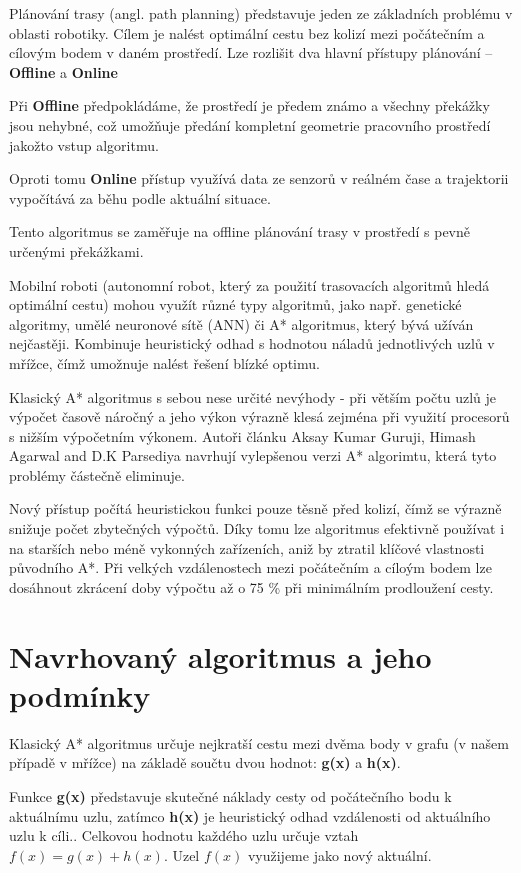 \documentclass[10pt, a4paper]{article}
\begin{document}
Plánování trasy (angl. path planning) představuje jeden ze základních problému v oblasti robotiky. Cílem je nalést optimální cestu bez kolizí mezi počátečním a cílovým bodem v daném prostředí. Lze rozlišit dva hlavní přístupy plánování – \textbf{Offline} a \textbf{Online}

Při \textbf{Offline} předpokládáme, že prostředí je předem známo a všechny překážky jsou nehybné, což umožňuje předání kompletní geometrie pracovního prostředí jakožto vstup algoritmu.

Oproti tomu \textbf{Online} přístup využívá data ze senzorů v reálném čase a trajektorii vypočítává za běhu podle aktuální situace.

Tento algoritmus se zaměřuje na offline plánování trasy v prostředí s pevně určenými překážkami.

Mobilní roboti (autonomní robot, který za použití trasovacích algoritmů hledá optimální cestu) mohou využít různé typy algoritmů, jako např. genetické algoritmy, umělé neuronové sítě (ANN) či A* algoritmus, který bývá užíván nejčastěji. Kombinuje heuristický odhad s hodnotou náladů jednotlivých uzlů v mřížce, čímž umožnuje nalést řešení blízké optimu.

Klasický A* algoritmus s sebou nese určité nevýhody - při větším počtu uzlů je výpočet časově náročný a jeho výkon výrazně klesá zejména při využití procesorů s nižším výpočetním výkonem. Autoři článku Aksay Kumar Guruji, Himash Agarwal and D.K Parsediya navrhují vylepšenou verzi A* algorimtu, která tyto problémy částečně eliminuje.

Nový přístup počítá heuristickou funkci pouze těsně před kolizí, čímž se výrazně snižuje počet zbytečných výpočtů. Díky tomu lze algoritmus efektivně používat i na starších nebo méně vykonných zařízeních, aniž by ztratil klíčové vlastnosti původního A*.
Při velkých vzdálenostech mezi počátečním a cíloým bodem lze dosáhnout zkrácení doby výpočtu až o 75 \% při minimálním prodloužení cesty.


\section{Navrhovaný algoritmus a jeho podmínky}
Klasický A* algoritmus určuje nejkratší cestu mezi dvěma body v grafu (v našem případě v mřížce) na základě součtu dvou hodnot: \textbf{g(x)} a \textbf{h(x)}.

Funkce \textbf{g(x)} představuje skutečné náklady cesty od počátečního bodu k aktuálnímu uzlu, zatímco \textbf{h(x)} je heuristický odhad vzdálenosti od aktuálního uzlu k cíli.\cite{WikiAStar}.
Celkovou hodnotu každého uzlu určuje vztah $f(x) = g(x) + h(x)$.
Uzel $f(x)$ využijeme jako nový aktuální.
\end{document}
